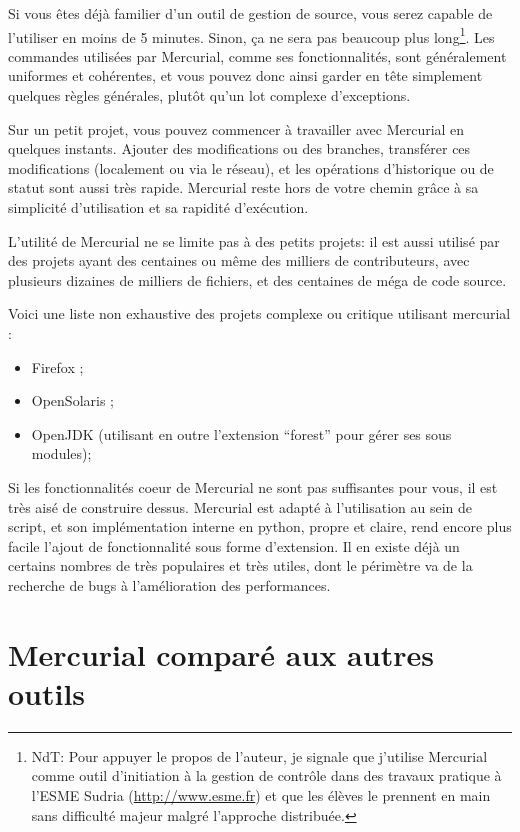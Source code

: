 Si vous êtes déjà familier d'un outil de gestion de source, vous serez
capable de l'utiliser en moins de 5 minutes. Sinon, ça ne sera pas beaucoup
plus long\footnote{NdT: Pour appuyer le propos de l'auteur, je signale que 
j'utilise Mercurial comme outil d'initiation à la gestion de contrôle dans
des travaux pratique à l'ESME Sudria (\url{http://www.esme.fr}) et que les
élèves le prennent en main sans difficulté majeur malgré l'approche distribuée.}. 
Les commandes utilisées par Mercurial, comme ses fonctionnalités, sont 
généralement uniformes et cohérentes, et vous pouvez donc ainsi garder en tête 
simplement quelques règles générales, plutôt qu'un lot complexe d'exceptions.

Sur un petit projet, vous pouvez commencer à travailler avec Mercurial en
quelques instants. Ajouter des modifications ou des branches, transférer 
ces modifications (localement ou via le réseau), et les opérations 
d'historique ou de statut sont aussi très rapide. Mercurial reste hors de 
votre chemin grâce à sa simplicité d'utilisation et sa rapidité d'exécution.

L'utilité de Mercurial ne se limite pas à des petits projets: il est 
aussi utilisé par des projets ayant des centaines ou même des milliers
de contributeurs, avec plusieurs dizaines de milliers de fichiers, et des
centaines de méga de code source.

Voici une liste non exhaustive des projets complexe ou critique utilisant 
mercurial :
\begin{itemize}
	\item Firefox ;
	\item OpenSolaris ;
	\item OpenJDK (utilisant en outre l'extension ``forest'' pour gérer
	ses sous modules);
\end{itemize}

Si les fonctionnalités coeur de Mercurial ne sont pas suffisantes pour vous, 
il est très aisé de construire dessus. Mercurial est adapté à l'utilisation
au sein de script, et son implémentation interne en python, propre et claire,
rend encore plus facile l'ajout de fonctionnalité sous forme d'extension. Il
en existe déjà un certains nombres de très populaires et très utiles, 
dont le périmètre va de la recherche de bugs à l'amélioration des performances.

\section{Mercurial comparé aux autres outils}


